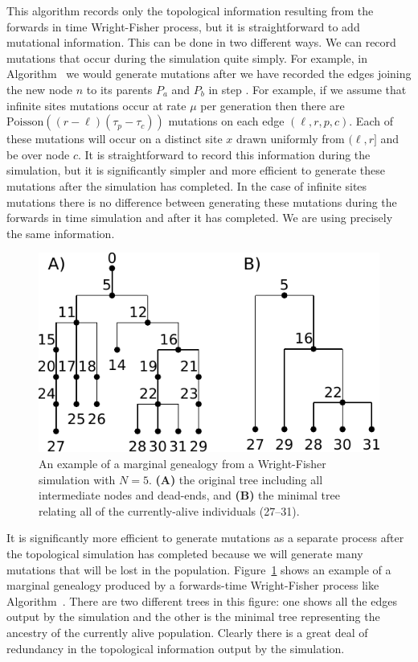 \documentclass{article}
\begin{document}
This algorithm records only the topological information resulting from the
forwards in time Wright-Fisher process, but it is straightforward to add
mutational information. This can be done in two different ways.
We can record mutations that occur during the simulation quite simply.
For example, in Algorithm~ we would generate mutations after
we have recorded the edges joining the new node $n$ to its parents
$P_a$ and $P_b$ in step .
For example, if we assume that infinite sites mutations
occur at rate $\mu$ per generation then there are $\mbox{Poisson}\left((r - \ell)(\tau_p
- \tau_c)\right)$ mutations on each edge $(\ell, r, p, c)$. Each of these mutations
will occur on a distinct site $x$ drawn uniformly from $(\ell, r]$ and be over node $c$.
It is straightforward to record this information during the simulation, but it
is significantly simpler and more efficient to generate these mutations
after the simulation has completed. In the case of infinite sites mutations
there is no difference between generating these mutations during the forwards
in time simulation and after it has completed. We are using precisely the same
information.

\begin{figure}
    \begin{center}
        \includegraphics{wf-before-after}
    \end{center}
    \caption{An example of a marginal genealogy from a Wright-Fisher simulation
    with $N=5$. \textbf{(A)} the original tree including all
    intermediate nodes and dead-ends, and \textbf{(B)} the minimal tree
    relating all of the currently-alive individuals (27--31).
    \label{fig:wf-trees}
    }
\end{figure}

It is significantly more efficient to generate mutations as a separate process
after the topological simulation has completed because we will generate many
mutations that will be lost in the population. Figure~\ref{fig:wf-trees} shows
an example of a marginal genealogy produced by a forwards-time Wright-Fisher
process like Algorithm~. There are two different trees in this
figure: one shows all the edges output by the simulation and the other
is the minimal tree representing the ancestry of the currently alive
population. Clearly there is a great deal of redundancy in the topological
information output by the simulation.
\end{document}
